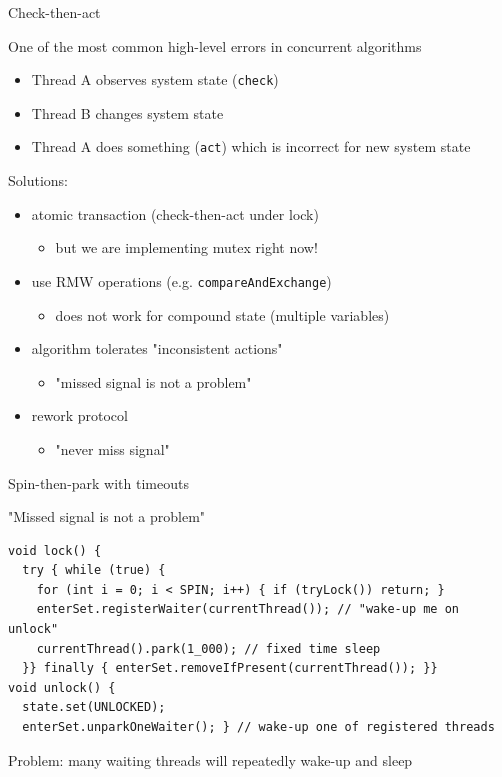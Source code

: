 
\begin{frame}[t]{Check-then-act}

One of the most common high-level errors in concurrent algorithms
\begin{itemize}
 \pause \item Thread A observes system state (\texttt{check})
 \pause \item Thread B changes system state
 \pause \item Thread A does something (\texttt{act}) which is incorrect for new system state 
\end{itemize}

\pause

Solutions:
\begin{itemize}
  \pause \item atomic transaction (check-then-act under lock)
  \begin{itemize}
    \pause \item but we are implementing mutex right now!
  \end{itemize}
  \pause \item use RMW operations (e.g. \texttt{compareAndExchange})
  \begin{itemize}
    \pause \item does not work for compound state (multiple variables)
  \end{itemize}
  \pause \item algorithm tolerates "inconsistent actions"
  \begin{itemize}
    \pause \item "missed signal is not a problem"
  \end{itemize}
  \pause \item rework protocol
  \begin{itemize}
    \pause \item "never miss signal"
  \end{itemize}
\end{itemize}
\end{frame}

\begin{frame}[t,fragile]{Spin-then-park with timeouts}

"Missed signal is not a problem"

\begin{verbatim}
void lock() {
  try { while (true) { 
    for (int i = 0; i < SPIN; i++) { if (tryLock()) return; }    
    enterSet.registerWaiter(currentThread()); // "wake-up me on unlock"
    currentThread().park(1_000); // fixed time sleep 
  }} finally { enterSet.removeIfPresent(currentThread()); }}
void unlock() { 
  state.set(UNLOCKED); 
  enterSet.unparkOneWaiter(); } // wake-up one of registered threads
\end{verbatim}

\pause
Problem: many waiting threads will repeatedly wake-up and sleep

\end{frame}

